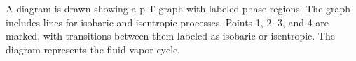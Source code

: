 A diagram is drawn showing a p-T graph with labeled phase regions. The graph includes lines for isobaric and isentropic processes. Points 1, 2, 3, and 4 are marked, with transitions between them labeled as isobaric or isentropic. The diagram represents the fluid-vapor cycle.
